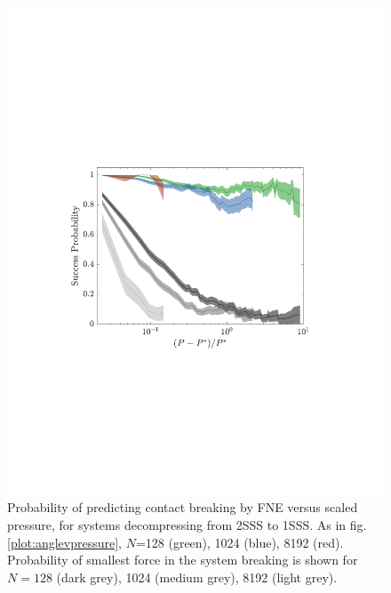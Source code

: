 \begin{figure}[t!]
\includegraphics[width=\columnwidth, trim=104 240 123 260, clip]{contactBreakingPaper/pcorrect.pdf}
\caption{Probability of predicting contact breaking by FNE versus scaled pressure, for systems decompressing from 2SSS to 1SSS. As in fig. \ref{plot:anglevpressure}, $N$=128 (green), 1024 (blue), 8192 (red). Probability of smallest force in the system breaking is shown for $N=128$ (dark grey), 1024 (medium grey), 8192 (light grey). %
}
\label{plot:predictionProb}
\end{figure}



